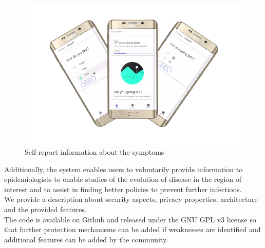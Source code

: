 \begin{figure}[H]
	\begin{center}
	    \includegraphics[scale=0.9]{imgs/phones_1.pdf}
 		\caption{Self-report information about the symptoms}
 		\label{fig:hi_low}
	\end{center}
\end{figure}



Additionally, the system enables users to voluntarily provide information to epidemiologists to enable studies of the evolution of disease in the region of interest and to assist in finding better policies to prevent further infections.
\\
We provide a description about security aspects, privacy properties, architecture and the provided features. 
\\
The code is available on Github and released under the GNU GPL v3 license so that further protection mechanisms can be added if weaknesses are identified and additional features can be added by the community.


